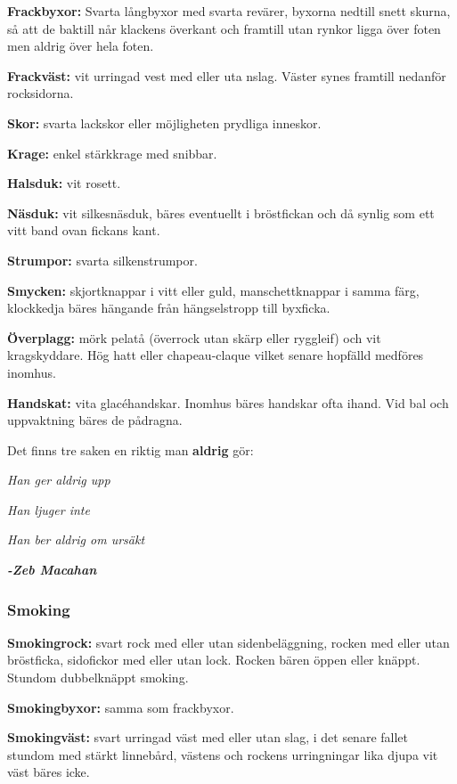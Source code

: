     \textbf{Frackbyxor:} Svarta långbyxor med svarta revärer, byxorna nedtill snett skurna, så att de baktill når klackens överkant och framtill utan rynkor ligga över foten men aldrig över hela foten.

    \textbf{Frackväst:} vit urringad vest med eller uta nslag. Väster synes framtill nedanför rocksidorna.

    \textbf{Skor:} svarta lackskor eller möjligheten prydliga inneskor.

    \textbf{Krage:} enkel stärkkrage med snibbar.

    \textbf{Halsduk:} vit rosett.

    \textbf{Näsduk:} vit silkesnäsduk, bäres eventuellt i bröstfickan och då synlig som ett vitt band ovan fickans kant.

    \textbf{Strumpor:} svarta silkenstrumpor.

    \textbf{Smycken:} skjortknappar i vitt eller guld, manschettknappar i samma färg, klockkedja bäres hängande från hängselstropp till byxficka.

    \textbf{Överplagg:} mörk pelatå (överrock utan skärp eller ryggleif) och vit kragskyddare. Hög hatt eller chapeau-claque vilket senare hopfälld medföres inomhus.

    \textbf{Handskat:} vita glacéhandskar. Inomhus bäres handskar ofta ihand. Vid bal och uppvaktning bäres de pådragna.

    Det finns tre saken en riktig man \textbf{aldrig} gör:

    \textit{Han ger aldrig upp}
    
    \textit{Han ljuger inte}
    
    \textit{Han ber aldrig om ursäkt}
    
    \textit{\textbf{-Zeb Macahan}} 

    \subsubsection{\textbf{Smoking}}

    \textbf{Smokingrock:} svart rock med eller utan sidenbeläggning, rocken med eller utan bröstficka, sidofickor med eller utan lock. Rocken bären öppen eller knäppt. Stundom dubbelknäppt smoking.

    \textbf{Smokingbyxor:} samma som frackbyxor.

    \textbf{Smokingväst:} svart urringad väst med eller utan slag, i det senare fallet stundom med stärkt linnebård, västens och rockens urringningar lika djupa vit väst bäres icke.

